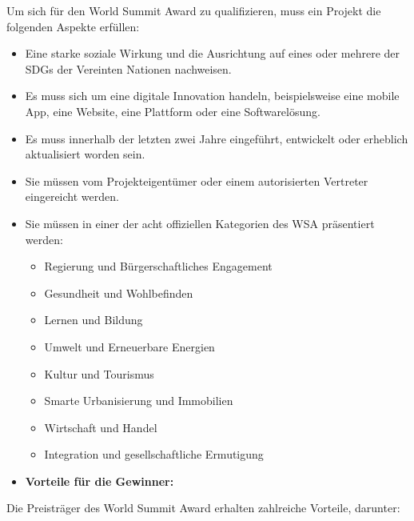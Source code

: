 Um sich für den World Summit Award zu qualifizieren, muss ein Projekt die folgenden Aspekte erfüllen:

\begin{itemize}
    \item {Eine starke soziale Wirkung und die Ausrichtung auf eines oder mehrere der SDGs der Vereinten Nationen nachweisen.}
    \item {Es muss sich um eine digitale Innovation handeln, beispielsweise eine mobile App, eine Website, eine Plattform oder eine Softwarelösung.}
    \item {Es muss innerhalb der letzten zwei Jahre eingeführt, entwickelt oder erheblich aktualisiert worden sein.}
    \item {Sie müssen vom Projekteigentümer oder einem autorisierten Vertreter eingereicht werden.}
    \item {Sie müssen in einer der acht offiziellen Kategorien des WSA präsentiert werden:}
          \begin{itemize}
              \item {Regierung und Bürgerschaftliches Engagement}
              \item {Gesundheit und Wohlbefinden}
              \item {Lernen und Bildung}
              \item {Umwelt und Erneuerbare Energien}
              \item {Kultur und Tourismus}
              \item {Smarte Urbanisierung und Immobilien}
              \item {Wirtschaft und Handel}
              \item {Integration und gesellschaftliche Ermutigung}
          \end{itemize}
\end{itemize}

\begin{itemize}
    \item \textbf{Vorteile für die Gewinner:}
\end{itemize}

Die Preisträger des World Summit Award erhalten zahlreiche Vorteile, darunter:

